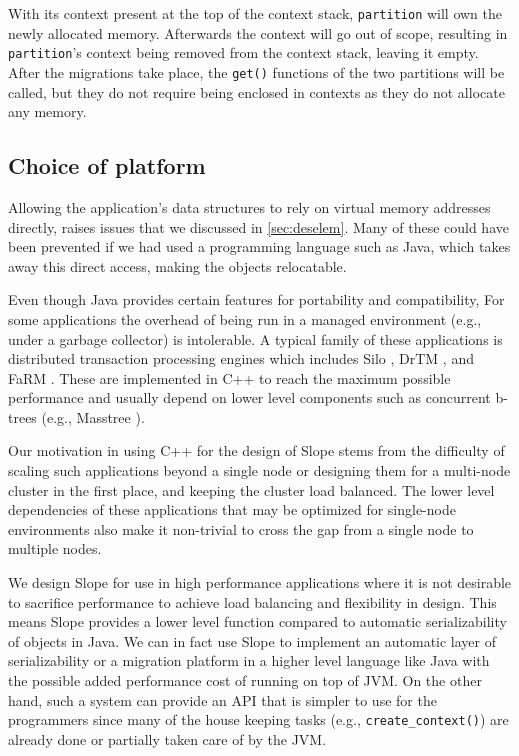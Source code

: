 With its context present at the top of
the context stack,
\texttt{partition} will own the newly allocated memory. Afterwards the context will
go out of scope, resulting in \texttt{partition}'s context being removed from the
context stack, leaving it empty. After the migrations take place, the \texttt{get()}
functions of the two partitions will be called, but they do not require
being enclosed in contexts as they do not allocate any memory.

\subsection{Choice of platform}
Allowing the application's data structures to rely on virtual memory
addresses directly, raises issues that we discussed in \ref{sec:deselem}. Many
of these could have been prevented if we had used a programming language such
as Java, which takes away this direct access, making the objects relocatable.

Even though Java provides certain features for portability and compatibility,
For some applications the overhead of being run in a managed environment
(e.g., under a garbage collector) is intolerable. A typical family of these
applications is distributed transaction
processing engines which includes Silo \cite{tu2013silo}, DrTM \cite{drtm2017},
and FaRM \cite{Dragojevic2014FaRM}. These are implemented in C++ to
reach the maximum possible performance and usually depend on lower level
components such as concurrent b-trees (e.g., Masstree \cite{mao2020masstree}).

Our motivation in using C++ for the design of Slope stems from the difficulty
of scaling such applications beyond a single node or designing them for a
multi-node cluster in the first place, and keeping the cluster load balanced.
The lower level dependencies of
these applications that may be optimized for single-node environments also
make it non-trivial to cross the gap from a single node to multiple nodes.

We design Slope for use in high performance applications where it is not
desirable to sacrifice performance to achieve load balancing and flexibility
in design. This means Slope provides a lower level function compared to
automatic serializability of objects in Java.
We can in fact use Slope to implement
an automatic layer of serializability or a migration platform in a higher
level language like Java with the possible added performance cost of running on
top of JVM. On the other hand, such a system can provide an API that is simpler
to use for the programmers since many of the house keeping tasks (e.g.,
\texttt{create\_context()}) are already done or partially taken care of by the JVM.


